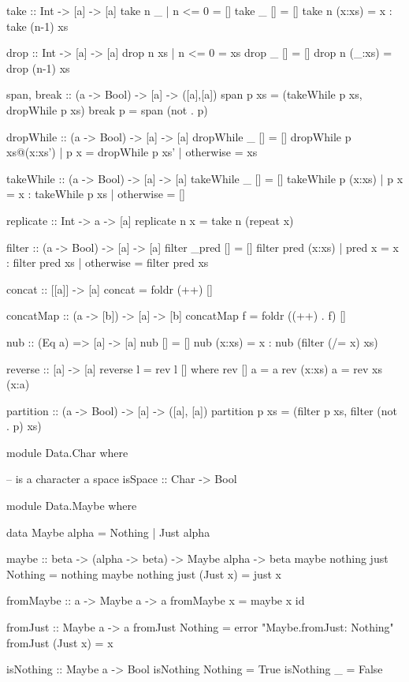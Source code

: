\begin{code}
take :: Int -> [a] -> [a]
take n _      | n <= 0 =  []
take _ []              =  []
take n (x:xs)          =  x : take (n-1) xs

drop :: Int -> [a] -> [a]
drop n xs     | n <= 0 =  xs
drop _ []              =  []
drop n (_:xs)          =  drop (n-1) xs

span, break :: (a -> Bool) -> [a] -> ([a],[a])
span p xs = (takeWhile p xs, dropWhile p xs)
break p                 =  span (not . p)

dropWhile               :: (a -> Bool) -> [a] -> [a]
dropWhile _ []          =  []
dropWhile p xs@(x:xs')
            | p x       =  dropWhile p xs'
            | otherwise =  xs

takeWhile               :: (a -> Bool) -> [a] -> [a]
takeWhile _ []          =  []
takeWhile p (x:xs) 
            | p x       =  x : takeWhile p xs
            | otherwise =  []

replicate               :: Int -> a -> [a]
replicate n x           =  take n (repeat x)

filter :: (a -> Bool) -> [a] -> [a]
filter _pred []    = []
filter pred (x:xs)
  | pred x         = x : filter pred xs
  | otherwise	   = filter pred xs

concat :: [[a]] -> [a]
concat = foldr (++) []

concatMap               :: (a -> [b]) -> [a] -> [b]
concatMap f             =  foldr ((++) . f) []

nub                     :: (Eq a) => [a] -> [a]
nub []             =  []
nub (x:xs)         =  x : nub (filter (/= x) xs)

reverse :: [a] -> [a]
reverse l =  rev l []
  where  rev []     a = a
         rev (x:xs) a = rev xs (x:a)
         
partition :: (a -> Bool) -> [a] -> ([a], [a])
partition p xs = (filter p xs, filter (not . p) xs)
\end{code}

\begin{code}
module Data.Char where

-- is a character a space
isSpace :: Char -> Bool
\end{code}


\begin{code}
module Data.Maybe where

data Maybe alpha = Nothing | Just alpha

maybe :: beta -> (alpha -> beta) -> Maybe alpha -> beta
maybe nothing just Nothing   = nothing
maybe nothing just (Just x)  = just x

fromMaybe :: a -> Maybe a -> a
fromMaybe x = maybe x id

fromJust          :: Maybe a -> a
fromJust Nothing  = error "Maybe.fromJust: Nothing"
fromJust (Just x) = x

isNothing         :: Maybe a -> Bool
isNothing Nothing = True
isNothing _       = False
\end{code}

